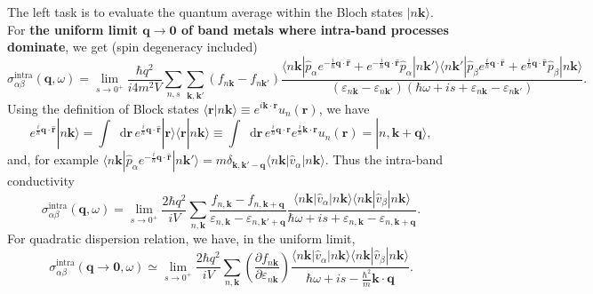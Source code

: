 \documentclass[10pt,nofootinbib,letterpaper]{revtex4}
\newcommand*\dd{\mathop{}\!\mathrm{d}}
\begin{document}
		\hfill\par
		The left task is to evaluate the quantum average within the Bloch states $|n\bm{k}\rangle$. For \textbf{the uniform limit $\bm{q}\rightarrow\bm{0}$ of band metals where intra-band processes dominate}, we get (spin degeneracy included)
		\begin{equation*}
			\sigma_{\alpha\beta}^{\text{intra}}(\bm{q},\omega)=\lim_{s \rightarrow0^+}\dfrac{\hbar q^2}{i4m^2V}\sum_{n,s}\sum_{\bm{k},\bm{k'}}(f_{n\bm{k}}-f_{n\bm{k'}})\dfrac{\langle n\bm{k}|\hat p_\alpha e^{-\frac i\hbar\bm{q}\cdot\hat{\bm{r}}}+e^{-\frac i\hbar\bm{q}\cdot\hat{\bm{r}}}\hat p_\alpha|n\bm{k'}\rangle\langle n\bm{k'}|\hat p_\beta e^{\frac i\hbar\bm{q}\cdot\hat{\bm{r}}}+e^{\frac i\hbar\bm{q}\cdot\hat{\bm{r}}}\hat p_\beta|n\bm{k}\rangle}{(\varepsilon_{n\bm{k}}-\varepsilon_{n\bm{k'}})(\hbar\omega+is+\varepsilon_{n\bm{k}}-\varepsilon_{n\bm{k'}})}.
		\end{equation*}
		Using the definition of Block states $\langle\bm{r}|n\bm{k}\rangle\equiv e^{i\bm{k}\cdot\bm{r}}u_n(\bm{r})$, we have
		\begin{equation*}
			e^{\frac i\hbar\bm{q}\cdot\hat{\bm{r}}}|n\bm{k}\rangle=\int\dd\bm{r}\,e^{\frac i\hbar\bm{q}\cdot\hat{\bm{r}}}|\bm{r}\rangle\langle\bm{r}|n\bm{k}\rangle\equiv\int\dd\bm{r}\,e^{\frac i\hbar\bm{q}\cdot\bm{r}}e^{\frac i\hbar\bm{k}\cdot\bm{r}}u_n(\bm{r})=|n,\bm{k}+\bm{q}\rangle,
		\end{equation*}
		and, for example $\langle n\bm{k}|\hat p_\alpha e^{-\frac i\hbar\bm{q}\cdot\hat{\bm{r}}}|n\bm{k'}\rangle=m\delta_{\bm{k},\bm{k'}-\bm{q}}\langle n\bm{k}|\hat v_\alpha|n\bm{k}\rangle$. Thus the intra-band conductivity
		\begin{equation}\label{1.4.9}
			\sigma_{\alpha\beta}^{\text{intra}}(\bm{q},\omega)=\lim_{s \rightarrow0^+}\dfrac{2\hbar q^2}{iV}\sum_{n,\bm{k}}\dfrac{f_{n,\bm{k}}-f_{n,\bm{k+q}}}{\varepsilon_{n,\bm{k}}-\varepsilon_{n,\bm{k'+q}}}\dfrac{\langle n\bm{k}|\hat v_\alpha|n\bm{k}\rangle \langle n\bm{k}|\hat v_\beta|n\bm{k}\rangle}{\hbar\omega+is+\varepsilon_{n,\bm{k}}-\varepsilon_{n,\bm{k+q}}}.
		\end{equation}
		For quadratic dispersion relation, we have, in the uniform limit,
		\begin{equation}\label{1.4.10}
			\sigma_{\alpha\beta}^{\text{intra}}(\bm{q}\rightarrow\bm{0},\omega)\simeq\lim_{s \rightarrow0^+}\dfrac{2\hbar q^2}{iV}\sum_{n,\bm{k}}\left(\dfrac{\partial f_{n\bm{k}}}{\partial \varepsilon_{n\bm{k}}}\right)\dfrac{\langle n\bm{k}|\hat v_\alpha|n\bm{k}\rangle \langle n\bm{k}|\hat v_\beta|n\bm{k}\rangle}{\hbar\omega+is-\frac{\hbar^2}{m}\bm{k}\cdot\bm{q}}.
		\end{equation}
\end{document}

